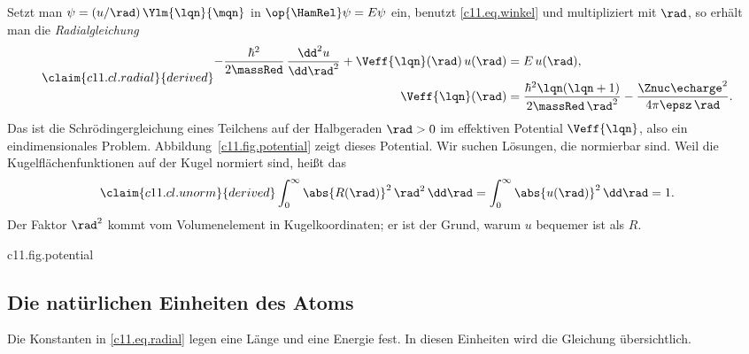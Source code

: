 Setzt man $\psi = (u/\rad)\,\Ylm{\lqn}{\mqn}$ in $\op{\HamRel}\psi = E\psi$ ein, benutzt
\eqref{c11.eq.winkel} und multipliziert mit $\rad$, so erhält man die
\emph{Radialgleichung}
\begin{equation}\label{c11.eq.radial}\claim{c11.cl.radial}{derived}
  \begin{aligned}
    -\frac{\hbar^2}{2\massRed}\,\frac{\dd^2 u}{\dd\rad^2} + \Veff{\lqn}(\rad)\,u(\rad)
    &= E\,u(\rad), \\
    \Veff{\lqn}(\rad) &= \frac{\hbar^2\lqn(\lqn + 1)}{2\massRed\,\rad^2}
      - \frac{\Znuc\echarge^2}{4\pi\epsz\,\rad}.
  \end{aligned}
\end{equation}
Das ist die Schrödingergleichung eines Teilchens auf der Halbgeraden $\rad > 0$ im
effektiven Potential $\Veff{\lqn}$, also ein eindimensionales Problem.
Abbildung~\ref{c11.fig.potential} zeigt dieses Potential. Wir suchen Lösungen, die
normierbar sind. Weil die
Kugelflächenfunktionen auf der Kugel normiert sind, heißt das
\begin{equation}\label{c11.eq.unorm}\claim{c11.cl.unorm}{derived}
  \int_0^\infty \abs{R(\rad)}^2\,\rad^2\,\dd\rad = \int_0^\infty \abs{u(\rad)}^2\,\dd\rad = 1 .
\end{equation}
Der Faktor $\rad^2$ kommt vom Volumenelement in Kugelkoordinaten; er ist der Grund,
warum $u$ bequemer ist als $R$.

\begin{tpcfigure}{c11.fig.potential}
  \caption{Das effektive Potential $\Veff{\lqn}$ aus \eqref{c11.eq.radial} für
    $\Znuc = 1$. Durchgezogen: $\lqn = 0$, das reine Coulombpotential. Gestrichelt:
    $\lqn = 1$; der Zentrifugalterm hält das Teilchen vom Ursprung fern und erzeugt eine
    Mulde, deren tiefster Punkt markiert ist. Dünne waagerechte Linien: die Energien
    $\En{1}$, $\En{2}$, $\En{3}$ aus Theorem~\ref{c11.thm.spektrum}. Längen in Einheiten
    von $\aRed$, Energien in Einheiten von $\RydRed$; beide enthalten die reduzierte
    Masse.}
\end{tpcfigure}

\subsection{Die natürlichen Einheiten des Atoms}\label{c11.s4.1}

Die Konstanten in \eqref{c11.eq.radial} legen eine Länge und eine Energie fest. In
diesen Einheiten wird die Gleichung übersichtlich.

